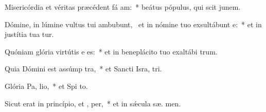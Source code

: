 \item Misericórdia et véritas præcédent fá am:~* beátus pópulus, qui scit junem.
\item Dómine, in lúmine vultus tui ambubunt,~\pscross{} et in nómine tuo exsultábunt  e:~* et in justítia tua tur.
\item Quóniam glória virtútis e  es:~* et in beneplácito tuo exaltábi  trum.
\item Quia Dómini est assúmp tra,~* et Sancti Isra,  tri.
\item Glória Pa,  lio,~* et Spi to.
\item Sicut erat in princípio, et ,  per,~* et in sǽcula sæ. men.
